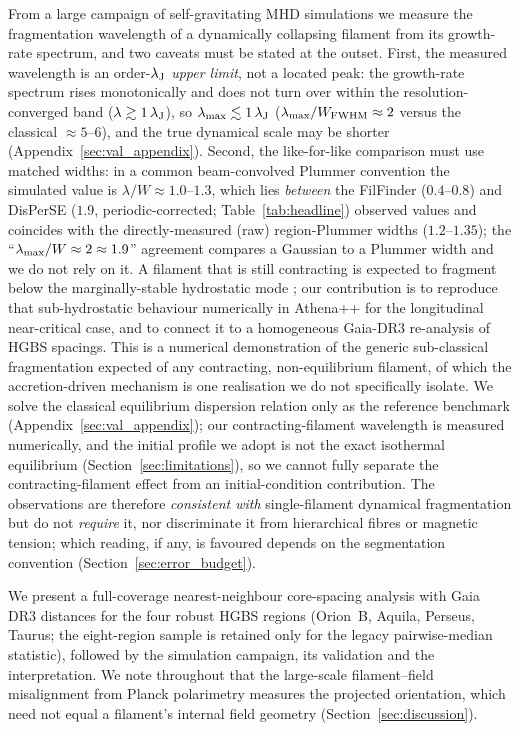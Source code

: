 \documentclass[usenatbib,twoside,twocolumn]{mnras}
\begin{document}
From a large campaign of self-gravitating MHD simulations we measure the fragmentation wavelength of a dynamically collapsing filament from its growth-rate spectrum, and two caveats must be stated at the outset. First, the measured wavelength is an order-$\lambda_{\rm J}$ \emph{upper limit}, not a located peak: the growth-rate spectrum rises monotonically and does not turn over within the resolution-converged band ($\lambda\gtrsim1\,\lambda_{\rm J}$), so $\lambda_{\rm max}\lesssim1\,\lambda_{\rm J}$ ($\lambda_{\rm max}/W_{\rm FWHM}\approx2$ versus the classical $\approx5$--$6$), and the true dynamical scale may be shorter (Appendix~\ref{sec:val_appendix}). Second, the like-for-like comparison must use matched widths: in a common beam-convolved Plummer convention the simulated value is $\lambda/W\approx1.0$--$1.3$, which lies \emph{between} the FilFinder ($0.4$--$0.8$) and DisPerSE ($1.9$, periodic-corrected; Table~\ref{tab:headline}) observed values and coincides with the directly-measured (raw) region-Plummer widths ($1.2$--$1.35$); the ``$\lambda_{\rm max}/W\approx2\approx1.9$'' agreement compares a Gaussian to a Plummer width and we do not rely on it. A filament that is still contracting is expected to fragment below the marginally-stable hydrostatic mode \citep{Clarke2016,Clarke2017}; our contribution is to reproduce that sub-hydrostatic behaviour numerically in Athena++ for the longitudinal near-critical case, and to connect it to a homogeneous Gaia-DR3 re-analysis of HGBS spacings. This is a numerical demonstration of the generic sub-classical fragmentation expected of any contracting, non-equilibrium filament, of which the accretion-driven \citet{Clarke2016,Clarke2017} mechanism is one realisation we do not specifically isolate. We solve the classical equilibrium dispersion relation only as the reference benchmark (Appendix~\ref{sec:val_appendix}); our contracting-filament wavelength is measured numerically, and the initial profile we adopt is not the exact isothermal equilibrium (Section~\ref{sec:limitations}), so we cannot fully separate the contracting-filament effect from an initial-condition contribution. The observations are therefore \emph{consistent with} single-filament dynamical fragmentation but do not \emph{require} it, nor discriminate it from hierarchical fibres or magnetic tension; which reading, if any, is favoured depends on the segmentation convention (Section~\ref{sec:error_budget}).

We present a full-coverage nearest-neighbour core-spacing analysis with Gaia DR3 distances \citep{Zhang2023} for the four robust HGBS regions (Orion~B, Aquila, Perseus, Taurus; the eight-region sample is retained only for the legacy pairwise-median statistic), followed by the simulation campaign, its validation and the interpretation. We note throughout that the large-scale filament--field misalignment from Planck polarimetry \citep{Planck2016} measures the projected orientation, which need not equal a filament's internal field geometry (Section~\ref{sec:discussion}).
\end{document}
